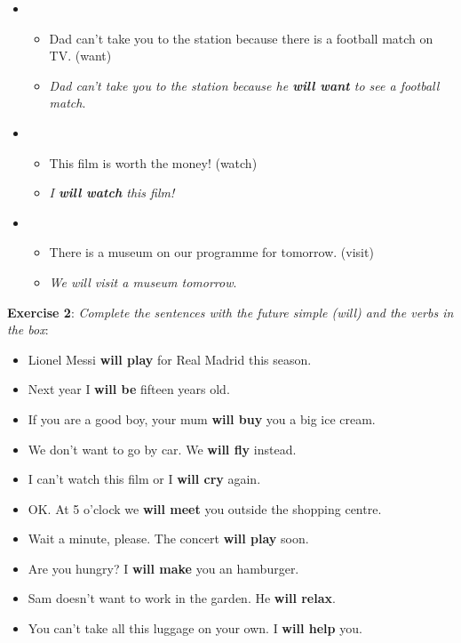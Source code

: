 \begin{itemize}
\item
\begin{itemize}
\item Dad can't take you to the station because there is a football match on TV. (want)
\item \textit{Dad can't take you to the station because he \textbf{will want} to see a football match}.
\end{itemize}

\item
\begin{itemize}
\item This film is worth the money! (watch)
\item \textit{I \textbf{will watch} this film!}
\end{itemize}

\item
\begin{itemize}
\item There is a museum on our programme for tomorrow. (visit)
\item \textit{We \textit{will visit} a museum tomorrow}.
\end{itemize}

\end{itemize}

\textbf{Exercise 2}: \textit{Complete the sentences with the future simple (will) and the verbs in the box}:

\begin{itemize}

\item Lionel Messi \textbf{will play} for Real Madrid this season.
\item Next year I \textbf{will be} fifteen years old.
\item If you are a good boy, your mum \textbf{will buy} you a big ice cream.
\item We don't want to go by car. We \textbf{will fly} instead.
\item I can't watch this film or I \textbf{will cry} again.
\item OK. At 5 o'clock we \textbf{will meet} you outside the shopping centre.
\item Wait a minute, please. The concert \textbf{will play} soon.
\item Are you hungry? I \textbf{will make} you an hamburger.
\item Sam doesn't want to work in the garden. He \textbf{will relax}.
\item You can't take all this luggage on your own. I \textbf{will help} you.

\end{itemize}


